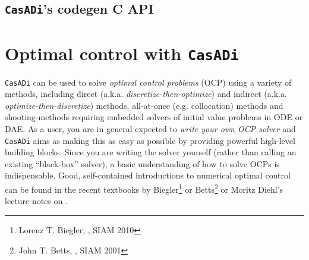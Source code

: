 \documentclass[a4paper,12pt]{book}
\newcommand{\CasADi}{\texttt{CasADi}\xspace}
\begin{document}
\section{\CasADi's codegen C API} \label{sec:c_api}

\chapter{Optimal control with \CasADi}
\CasADi can be used to solve \emph{optimal control problems} (OCP) using a variety of methods, including direct (a.k.a. \emph{discretize-then-optimize}) and indirect (a.k.a. \emph{optimize-then-discretize}) methods, all-at-once (e.g. collocation) methods and shooting-methods requiring embedded solvers of initial value problems in ODE or DAE. As a user, you are in general expected to \emph{write your own OCP solver} and \CasADi aims as making this as easy as possible by providing powerful high-level building blocks. Since you are writing the solver yourself (rather than calling an existing ``black-box'' solver), a basic understanding of how to solve OCPs is indispensable. Good, self-contained introductions to numerical optimal control can be found in the recent textbooks by Biegler\footnote{Lorenz T. Biegler, \emph{}, SIAM 2010} or Betts\footnote{John T. Betts, \emph{}, SIAM 2001} or Moritz Diehl's lecture notes on .
\end{document}
